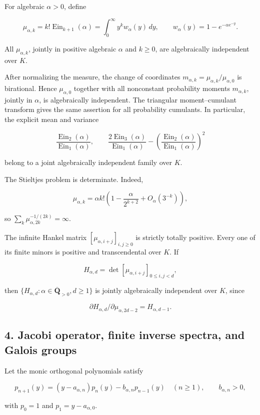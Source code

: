 \documentclass[11pt]{article}
\theoremstyle{keio}
\theoremstyle{definition}
\theoremstyle{remark}
\newcommand{\Ein}{\operatorname{Ein}}
\begin{document}
For algebraic \(\alpha>0\), define

\[
\mu_{\alpha,k}=k!\Ein_{k+1}(\alpha)
=\int_0^\infty y^k w_\alpha(y)\,dy,
\qquad w_\alpha(y)=1-e^{-\alpha e^{-y}}. \tag{TP-4}
\]

All \(\mu_{\alpha,k}\), jointly in positive algebraic \(\alpha\) and
\(k\ge0\), are algebraically independent over \(K\).

After normalizing the measure, the change of coordinates
\(m_{\alpha,k}=\mu_{\alpha,k}/\mu_{\alpha,0}\) is birational. Hence
\(\mu_{\alpha,0}\) together with all nonconstant probability moments
\(m_{\alpha,k}\), jointly in \(\alpha\), is algebraically independent.
The triangular moment--cumulant transform gives the same assertion for all
probability cumulants. In particular, the explicit mean and variance

\[
\frac{\Ein_2(\alpha)}{\Ein_1(\alpha)},\qquad
\frac{2\Ein_3(\alpha)}{\Ein_1(\alpha)}
-\left(\frac{\Ein_2(\alpha)}{\Ein_1(\alpha)}\right)^2
\]

belong to a joint algebraically independent family over \(K\).

The Stieltjes problem is determinate. Indeed,

\[
\mu_{\alpha,k}=\alpha k!\left(1-\frac{\alpha}{2^{k+2}}
+O_\alpha(3^{-k})\right), \tag{TP-5}
\]

so \(\sum_k\mu_{\alpha,2k}^{-1/(2k)}=\infty\).

The infinite Hankel matrix \([\mu_{\alpha,i+j}]_{i,j\ge0}\) is strictly
totally positive. Every one of its finite minors is positive and
transcendental over \(K\). If

\[
H_{\alpha,d}=\det[\mu_{\alpha,i+j}]_{0\le i,j<d},
\]

then \(\{H_{\alpha,d}:\alpha\in\overline{\mathbf Q}_{>0},d\ge1\}\) is
jointly algebraically independent over \(K\), since

\[
\partial H_{\alpha,d}/\partial\mu_{\alpha,2d-2}=H_{\alpha,d-1}.
\]

\subsection{4. Jacobi operator, finite inverse spectra, and Galois groups}

Let the monic orthogonal polynomials satisfy

\[
p_{n+1}(y)=(y-a_{\alpha,n})p_n(y)-b_{\alpha,n}p_{n-1}(y)
\quad(n\ge1),\qquad b_{\alpha,n}>0,
\]

with \(p_0=1\) and \(p_1=y-a_{\alpha,0}\).
\end{document}
